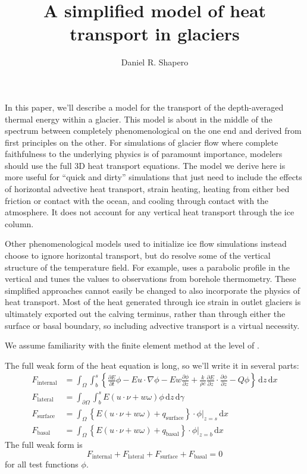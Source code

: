 \documentclass{article}
\title{A simplified model of heat transport in glaciers}
\author{Daniel R. Shapero}
\date{}
\theoremstyle{definition}
\theoremstyle{plain}
\newcommand{\ud}{\hspace{2pt}\mathrm{d}}
\begin{document}
\maketitle

In this paper, we'll describe a model for the transport of the depth-averaged thermal energy within a glacier.
This model is about in the middle of the spectrum between completely phenomenological on the one end and derived from first principles on the other.
For simulations of glacier flow where complete faithfulness to the underlying physics is of paramount importance, modelers should use the full 3D heat transport equations.
The model we derive here is more useful for ``quick and dirty'' simulations that just need to include the effects of horizontal advective heat transport, strain heating, heating from either bed friction or contact with the ocean, and cooling through contact with the atmosphere.
It does not account for any vertical heat transport through the ice column.

Other phenomenological models used to initialize ice flow simulations instead choose to ignore horizontal transport, but do resolve some of the vertical structure of the temperature field.
For example, \citet{humbert2005parameter} uses a parabolic profile in the vertical and tunes the values to observations from borehole thermometry.
These simplified approaches cannot easily be changed to also incorporate the physics of heat transport.
Most of the heat generated through ice strain in outlet glaciers is ultimately exported out the calving terminus, rather than through either the surface or basal boundary, so including advective transport is a virtual necessity.

We assume familiarity with the finite element method at the level of \citet{braess2007finite}.

The full weak form of the heat equation is long, so we'll write it in several parts:
\begin{align}
    F_{\text{internal}} & = \int_\Omega\int_b^s\left\{\frac{\partial E}{\partial t}\phi - E u\cdot\nabla\phi - E w\frac{\partial\phi}{\partial z} + \frac{k}{\rho c}\frac{\partial E}{\partial z}\cdot\frac{\partial\phi}{\partial z} - Q\phi\right\}\ud z\ud x \\
    F_{\text{lateral}} & = \int_{\partial\Omega}\int_b^s E(u\cdot\nu + w\omega)\phi \ud z\ud\gamma \\
    F_{\text{surface}} & = \int_\Omega\left\{E(u\cdot\nu + w\omega) + q_{\text{surface}}\right\}\cdot\phi\Big|_{z = s}\ud x \\
    F_{\text{basal}} & = \int_\Omega\left\{E(u\cdot\nu + w\omega) + q_{\text{basal}}\right\}\cdot\phi\Big|_{z = b}\ud x
\end{align}
The full weak form is
\begin{equation}
    F_{\text{internal}} + F_{\text{lateral}} + F_{\text{surface}} + F_{\text{basal}} = 0
    \label{eq:full-weak-form}
\end{equation}
for all test functions $\phi$.
\end{document}
